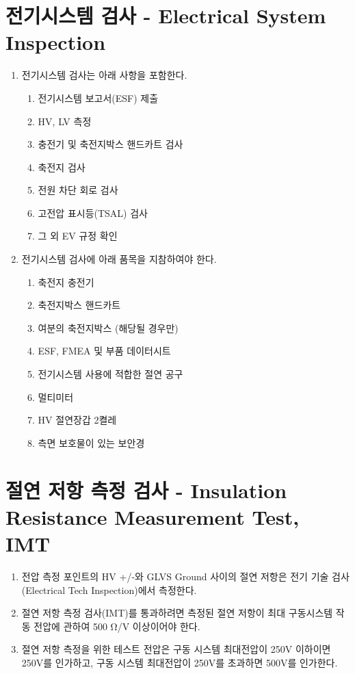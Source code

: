 \documentclass[final,a4paper,10pt]{report}
\begin{document}
\section{전기시스템 검사 - Electrical System Inspection}
\begin{enumerate}
  \item 전기시스템 검사는 아래 사항을 포함한다.
    \begin{enumerate}
      \item 전기시스템 보고서(ESF) 제출
      \item HV, LV 측정
      \item 충전기 및 축전지박스 핸드카트 검사
      \item 축전지 검사
      \item 전원 차단 회로 검사
      \item 고전압 표시등(TSAL) 검사
      \item 그 외 EV 규정 확인
    \end{enumerate}
  \item 전기시스템 검사에 아래 품목을 지참하여야 한다.
    \begin{enumerate}
      \item 축전지 충전기
      \item 축전지박스 핸드카트
      \item 여분의 축전지박스 (해당될 경우만)
      \item ESF, FMEA 및 부품 데이터시트
      \item 전기시스템 사용에 적합한 절연 공구
      \item 멀티미터
      \item HV 절연장갑 2켤레
      \item 측면 보호물이 있는 보안경
    \end{enumerate}
\end{enumerate}

\section{절연 저항 측정 검사 - Insulation Resistance Measurement Test, IMT} \label{section:절연 저항 측정 검사}
\begin{enumerate}
  \item 전압 측정 포인트의 HV +/-와 GLVS Ground 사이의 절연 저항은 전기 기술 검사(Electrical Tech Inspection)에서 측정한다.
  \item 절연 저항 측정 검사(IMT)를 통과하려면 측정된 절연 저항이 최대 구동시스템 작동 전압에 관하여 500 Ω/V 이상이어야 한다.
  \item 절연 저항 측정을 위한 테스트 전압은 구동 시스템 최대전압이 250V 이하이면 250V를 인가하고, 구동 시스템 최대전압이 250V를 초과하면 500V를 인가한다.
\end{enumerate}
\end{document}
